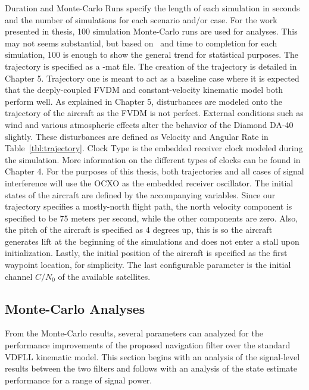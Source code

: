 Duration and Monte-Carlo Runs specify the length of each simulation in seconds and the number of simulations for each scenario and/or case. For the work presented in thesis, 100 simulation Monte-Carlo runs are used for analyses. This may not seems substantial, but based on~\cite{khaghaniAssessmentVDMbasedAutonomous2018,khaghaniAutonomousVehicleDynamic2016,mwenegohaModelbasedTightlyCoupled2020} and time to completion for each simulation, 100 is enough to show the general trend for statistical purposes. The trajectory is specified as a -mat file. The creation of the trajectory is detailed in Chapter 5. Trajectory one is meant to act as a baseline case where it is expected that the deeply-coupled FVDM and constant-velocity kinematic model both perform well.  As explained in Chapter 5, disturbances are modeled onto the trajectory of the aircraft as the FVDM is not perfect. External conditions such as wind and various atmospheric effects alter the behavior of the Diamond DA-40 slightly. These disturbances are defined as Velocity and Angular Rate in Table~\ref{tbl:trajectory}. Clock Type is the embedded receiver clock modeled during the simulation. More information on the different types of clocks can be found in Chapter 4. For the purposes of this thesis, both trajectories and all cases of signal interference will use the OCXO as the embedded receiver oscillator. The initial states of the aircraft are defined by the accompanying variables. Since our trajectory specifies a mostly-north flight path, the north velocity component is specified to be 75 meters per second, while the other components are zero. Also, the pitch of the aircraft is specified as 4 degrees up, this is so the aircraft generates lift at the beginning of the simulations and does not enter a stall upon initialization. Lastly, the initial position of the aircraft is specified as the first waypoint location, for simplicity. The last configurable parameter is the initial channel \(C/N_0\) of the available satellites.


\subsection{\textbf{Monte-Carlo Analyses}}
From the Monte-Carlo results, several parameters can analyzed for the performance improvements of the proposed navigation filter over the standard VDFLL kinematic model. This section begins with an analysis of the signal-level results between the two filters and follows with an analysis of the state estimate performance for a range of signal power.

